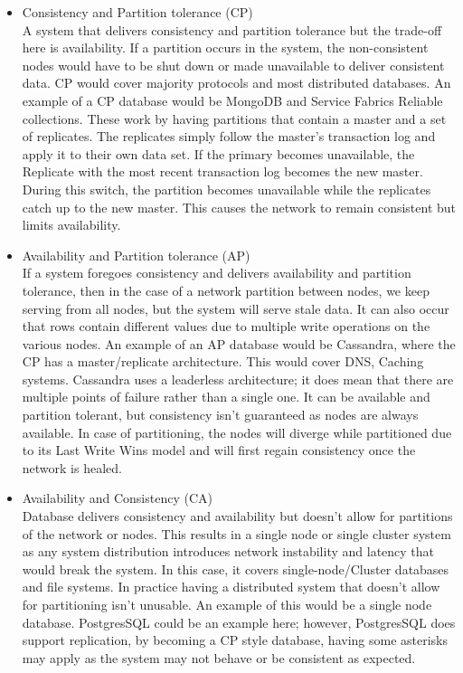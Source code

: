 \documentclass[a4paper,10pt,titlepage]{report}
\begin{document}
    \begin{itemize}
        \item Consistency and Partition tolerance (CP) \\ A system that delivers consistency and partition tolerance but the trade-off here is availability. If a partition occurs in the system, the non-consistent nodes would have to be shut down or made unavailable to deliver consistent data. CP would cover majority protocols and most distributed databases. An example of a CP database would be MongoDB and Service Fabrics Reliable collections. These work by having partitions that contain a master and a set of replicates. The replicates simply follow the master's transaction log and apply it to their own data set. If the primary becomes unavailable, the Replicate with the most recent transaction log becomes the new master. During this switch, the partition becomes unavailable while the replicates catch up to the new master. This causes the network to remain consistent but limits availability. \\

        \item Availability and Partition tolerance (AP) \\ If a system foregoes consistency and delivers availability and partition tolerance, then in the case of a network partition between nodes, we keep serving from all nodes, but the system will serve stale data. It can also occur that rows contain different values due to multiple write operations on the various nodes. An example of an AP database would be Cassandra, where the CP has a master/replicate architecture. This would cover DNS, Caching systems. Cassandra uses a leaderless architecture; it does mean that there are multiple points of failure rather than a single one. It can be available and partition tolerant, but consistency isn't guaranteed as nodes are always available. In case of partitioning, the nodes will diverge while partitioned due to its Last Write Wins model and will first regain consistency once the network is healed. \\

        \item Availability and Consistency (CA) \\ Database delivers consistency and availability but doesn't allow for partitions of the network or nodes. This results in a single node or single cluster system as any system distribution introduces network instability and latency that would break the system. In this case, it covers single-node/Cluster databases and file systems. In practice having a distributed system that doesn't allow for partitioning isn't unusable. An example of this would be a single node database. PostgresSQL could be an example here; however, PostgresSQL does support replication, by becoming a CP style database, having some asterisks may apply as the system may not behave or be consistent\cite{aphyrpostgres} as expected. \\
    \end{itemize}
\end{document}
